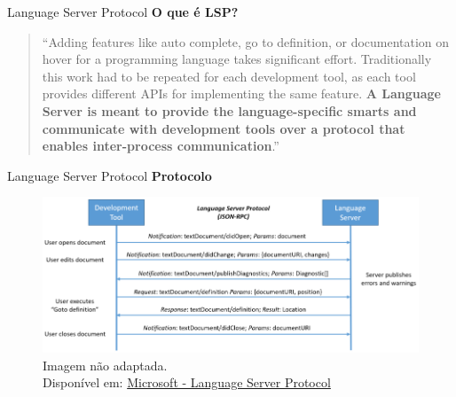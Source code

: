 \begin{frame}{Language Server Protocol}
    \textbf{O que é LSP?}
    \begin{quotation} \small
      ``Adding features like auto complete, go to definition, or documentation on hover for a programming language takes
      significant effort. Traditionally this work had to be repeated for each development tool, as each tool provides
      different APIs for implementing the same feature. \textbf{A Language Server is meant to provide the language-specific
      smarts and communicate with development tools over a protocol that enables inter-process
      communication}\cite{microsoftLSP}.''
    \end{quotation}
\end{frame}

\begin{frame}{Language Server Protocol}
  \textbf{Protocolo}
  \begin{figure}
      \centering
      \includegraphics[height=0.4\linewidth]{Image/LSP-Diagram.png}
      \label{lsp-diagram}
      \footnotesize
      \\ Imagem não adaptada. \\
      Disponível em: \hyperlink{https://microsoft.github.io/language-server-protocol/overviews/lsp/overview/}{Microsoft - Language Server Protocol}
  \end{figure}
\end{frame}

